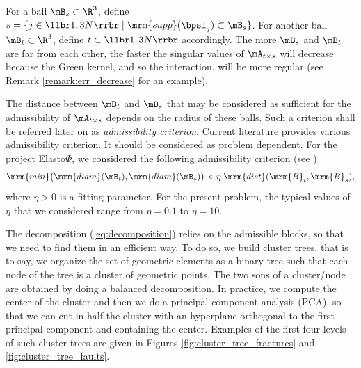 For a ball $\mB_{s}\subset \R^{3}$, define $s = \{j \in\llbr 1,3N\rrbr\;\vert \;\mrm{supp}(\bpsi_{j})\subset \mB_{s}\}$. 
For another ball $\mB_{t}\subset \R^{3}$, define $t\subset \llbr1,3N\rrbr$ accordingly.  
The more $\mB_{s}$ and $\mB_{t}$ are far from each other, the faster the singular values of $\mA_{t \times s}$ will decrease because the Green kernel, and so the interaction, will be more regular (see Remark \ref{remark:err_decrease} for an example).

The distance between $\mB_{t}$ and $\mB_{s}$ that may be considered as sufficient for the admissibility of $\mA_{t \times s}$ depends on the radius of these balls. 
Such a criterion shall be referred later on as \textit{admissibility criterion}. Current literature provides various 
admissibility criterion. It should be considered as problem dependent. For the project Elasto$\Phi$, we considered the 
following admissibility criterion (see \cite{Rjasanow2007})
\begin{equation}\label{AdmissibilityCondition}
\mrm{min}\big( \mrm{diam}(\mB_{t}),\mrm{diam}(\mB_{s})\big)< \eta\;\mrm{dist}(\mrm{B}_{t},\mrm{B}_{s}),
\end{equation}
where $\eta>0$ is a fitting parameter. For the present problem, the typical values of $\eta$ that we considered  
range from $\eta = 0.1$ to $\eta = 10$. 

The decomposition (\ref{eq:decomposition}) relies on the admissible blocks, so that we need to find them in an efficient way. To do so, we build cluster trees, that is to say, we organize the set of geometric elements as a binary tree such that each node of the tree is a cluster of geometric points. The two sons of a cluster/node are obtained by doing a balanced decomposition. In practice, we compute the center of the cluster and then we do a principal component analysis (PCA), so that we can cut in half the cluster with an hyperplane orthogonal to the first principal component and containing the center. Examples of the first four levels of such cluster trees are given in Figures \ref{fig:cluster_tree_fractures} and \ref{fig:cluster_tree_faults}.

